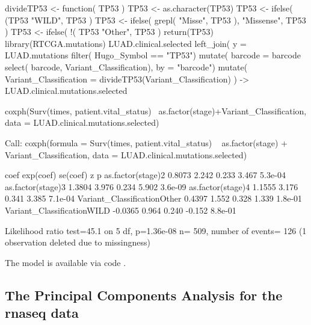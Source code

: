 \begin{Schunk}
\begin{Sinput}
divideTP53 <- function( TP53 ){
   TP53 <- as.character(TP53)
   TP53 <- ifelse( (TP53  %
                   "WILD", 
                   TP53 )
   TP53 <- ifelse( grepl( "Misse", TP53 ), 
                   "Missense", 
                   TP53 )
   TP53 <- ifelse( !( TP53 %
                   "Other",
                   TP53 )
   return(TP53)
}
library(RTCGA.mutations)
LUAD.clinical.selected %
      left_join( y = LUAD.mutations %
                    filter( Hugo_Symbol == "TP53") %
                    mutate( barcode = barcode %
                    select( barcode, Variant_Classification),
                 by = "barcode") %
                    mutate( Variant_Classification = divideTP53(Variant_Classification) ) ->
   LUAD.clinical.mutations.selected

      coxph(Surv(times, patient.vital_status)~ as.factor(stage)+Variant_Classification,
            data = LUAD.clinical.mutations.selected)
\end{Sinput}
\begin{Soutput}
Call:
coxph(formula = Surv(times, patient.vital_status) ~ as.factor(stage) + 
    Variant_Classification, data = LUAD.clinical.mutations.selected)


                               coef exp(coef) se(coef)      z       p
as.factor(stage)2            0.8073     2.242    0.233  3.467 5.3e-04
as.factor(stage)3            1.3804     3.976    0.234  5.902 3.6e-09
as.factor(stage)4            1.1555     3.176    0.341  3.385 7.1e-04
Variant_ClassificationOther  0.4397     1.552    0.328  1.339 1.8e-01
Variant_ClassificationWILD  -0.0365     0.964    0.240 -0.152 8.8e-01

Likelihood ratio test=45.1  on 5 df, p=1.36e-08  n= 509, number of events= 126 
   (1 observation deleted due to missingness)
\end{Soutput}
\end{Schunk}

The model is available via code .

\newpage

\subsection{The Principal Components Analysis for the rnaseq
data}\label{the-principal-components-analysis-for-the-rnaseq-data}

